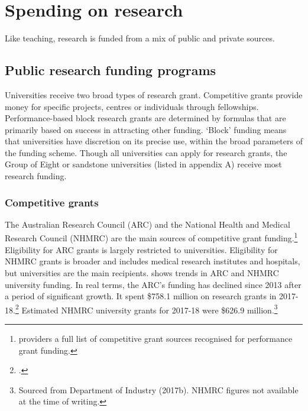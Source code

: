 \documentclass{grattan}
\begin{document}
%
\section{Spending on research}\label{sec:spending-on-research}

Like teaching, research is funded from a mix of public and private sources.

%
\subsection{Public research funding programs}\label{subsec:public-research-funding-programs}

Universities receive two broad types of research grant. Competitive grants provide money for specific projects, centres or individuals through fellowships. Performance-based block research grants are determined by formulas that are primarily based on success in attracting other funding. `Block' funding means that universities have discretion on its precise use, within the broad parameters of the funding scheme. Though all universities can apply for research grants, the Group of Eight or sandstone universities (listed in appendix A) receive most research funding.

%
\subsubsection{Competitive grants}\label{subsubsec:competitive-grants}

The Australian Research Council (ARC) and the National Health and Medical Research Council (NHMRC) are the main sources of competitive grant funding.\footnote{\textcite[][]{DepartmentofEducationandTraining20182018australiancom} providers a full list of competitive grant sources recognised for performance grant funding.} Eligibility for ARC grants is largely restricted to universities. Eligibility for NHMRC grants is broader and includes medical research institutes and hospitals, but universities are the main recipients.  shows trends in ARC and NHMRC university funding. In real terms, the ARC's funding has declined since 2013 after a period of significant growth. It spent \$758.1 million on research grants in 2017-18.\footcite[][121]{DepartmentofEducationandTraining2018portfoliobudgetst} Estimated NHMRC university grants for 2017-18 were \$626.9 million.\footnote{Sourced from Department of Industry (2017b). NHMRC figures not available at the time of writing.}
\end{document}
